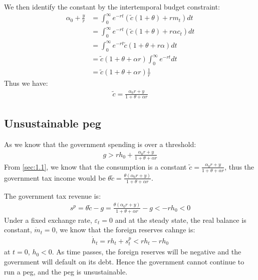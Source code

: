 \documentclass[a4paper,12pt]{article} %
\theoremstyle{nonitalic}
\begin{document}
We then identify the constant by the intertemporal budget constraint:
\begin{align*}
    \alpha_0 + \frac{y}{r} &= \int _0^{\infty} e^{-rt} \left(\tilde{c}(1+\theta) + r m_t \right) dt \\
    &= \int _0^{\infty} e^{-rt} \left(\tilde{c}(1+\theta) + r \alpha c_t \right) dt \\
    &= \int _0^{\infty} e^{-rt} \tilde{c}(1+\theta + r \alpha) dt \\
    &= \tilde{c} (1+\theta +\alpha r) \int _0^{\infty} e^{-rt} dt \\
    &= \tilde{c} (1+\theta +\alpha r) \frac{1}{r}
\end{align*}
Thus we have:
\begin{gather*}
    \tilde{c} = \frac{\alpha_0 r + y}{1 + \theta + \alpha r}
\end{gather*}



\subsection{Unsustainable peg}\label{sec:1.2}

As we know that the government spending is over a threshold:
\begin{gather*}
    g > r h_0 + \frac{\alpha_0 r + y}{1 + \theta + \alpha r}
\end{gather*}
From \ref{sec:1.1}, we know that the consumption is a constant $\tilde{c} = \frac{\alpha_0 r + y}{1 + \theta + \alpha r}$,
thus the government tax income would be $\theta \tilde{c} = \frac{\theta (\alpha_0 r + y)}{1 + \theta + \alpha r} $.

The government tax revenue is:
\begin{gather*}
    s^p = \theta \tilde{c} - g = \frac{\theta (\alpha_0 r + y)}{1 + \theta + \alpha r} - g < -r h_0 < 0
\end{gather*}
Under a fixed exchange rate, $\varepsilon_t = 0$ and at the steady state, the real balance is constant, $\dot{m}_t = 0$,
we know that the foreign reserves cahnge is:
\begin{gather*}
    \dot{h}_t = r h_t + s_t^p < r h_t - r h_0
\end{gather*}
at $t=0$, $h_0 < 0$. As time passes, the foreign reserves will be negative and the government will default on its debt.
Hence the government cannot continue to run a peg, and the peg is unsustainable.
\end{document}
